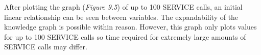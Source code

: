 After plotting the graph (\textit{Figure 9.5}) of up to 100 SERVICE calls, an initial linear relationship can be seen between variables. The expandability of the knowledge graph is possible within reason. However, this graph only plots values for up to 100 SERVICE calls so time required for extremely large amounts of SERVICE calls may differ. 
